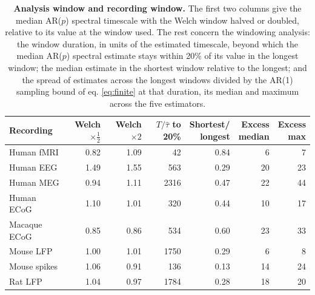 \begin{table}[h]
\caption{\textbf{Analysis window and recording window.} The first two columns give the median AR($p$) spectral timescale with the Welch window halved or doubled, relative to its value at the window used. The rest concern the windowing analysis: the window duration, in units of the estimated timescale, beyond which the median AR($p$) spectral estimate stays within 20\% of its value in the longest window; the median estimate in the shortest window relative to the longest; and the spread of estimates across the longest windows divided by the AR(1) sampling bound of eq. \ref{eq:finite} at that duration, its median and maximum across the five estimators.}\label{tab:s_windows}
\setlength{\tabcolsep}{3pt}
\begin{tabular}{lrrrrrr}
\toprule
Recording & \shortstack[c]{Welch \\ $\times\tfrac12$} & \shortstack[c]{Welch \\ $\times 2$} & \shortstack[c]{$T/\hat\tau$ \\ to 20\%} & \shortstack[c]{Shortest/ \\ longest} & \shortstack[c]{Excess \\ median} & \shortstack[c]{Excess \\ max} \\
\midrule
Human fMRI & 0.82 & 1.09 & 42 & 0.84 & 6 & 7 \\
Human EEG & 1.49 & 1.55 & 563 & 0.29 & 20 & 23 \\
Human MEG & 0.94 & 1.11 & 2316 & 0.47 & 22 & 44 \\
Human ECoG & 1.10 & 1.01 & 320 & 0.44 & 10 & 17 \\
Macaque ECoG & 0.85 & 0.86 & 534 & 0.60 & 23 & 33 \\
Mouse LFP & 1.00 & 1.01 & 1750 & 0.29 & 6 & 8 \\
Mouse spikes & 1.06 & 0.91 & 136 & 0.13 & 14 & 24 \\
Rat LFP & 1.04 & 0.97 & 1784 & 0.28 & 18 & 20 \\
\bottomrule
\end{tabular}
\end{table}
